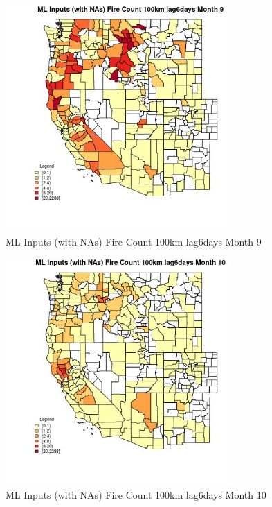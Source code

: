 \clearpage 

\begin{figure} 
\centering  
\includegraphics[width=0.77\textwidth]{Code_Outputs/Report_ML_input_PM25_Step4_part_e_de_duplicated_aves_compiled_2019-05-20wNAs_CountyFire_Count_100km_lag6daysmedianMonth9.jpg} 
\caption{\label{fig:Report_ML_input_PM25_Step4_part_e_de_duplicated_aves_compiled_2019-05-20wNAsCountyFire_Count_100km_lag6daysmedianMonth9}ML Inputs (with NAs) Fire Count 100km lag6days Month 9} 
\end{figure} 
 

\begin{figure} 
\centering  
\includegraphics[width=0.77\textwidth]{Code_Outputs/Report_ML_input_PM25_Step4_part_e_de_duplicated_aves_compiled_2019-05-20wNAs_CountyFire_Count_100km_lag6daysmedianMonth10.jpg} 
\caption{\label{fig:Report_ML_input_PM25_Step4_part_e_de_duplicated_aves_compiled_2019-05-20wNAsCountyFire_Count_100km_lag6daysmedianMonth10}ML Inputs (with NAs) Fire Count 100km lag6days Month 10} 
\end{figure} 
 

